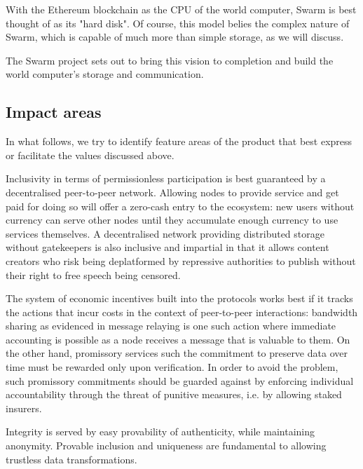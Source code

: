  
With the Ethereum blockchain as the CPU of the world computer, Swarm is best thought of as its "hard disk". Of course, this model belies the complex nature of Swarm, which is capable of much more than simple storage, as we will discuss.

The Swarm project sets out to bring this vision to completion and build the world computer's storage and communication. 

\subsection{Impact areas \statusorange}

In what follows, we try to identify feature areas of the product that best express or facilitate the values discussed above. 

Inclusivity in terms of permissionless participation is best guaranteed by a decentralised peer-to-peer network.  
Allowing nodes to provide service and get paid for doing so will offer a zero-cash entry to the ecosystem: new users without currency can serve other nodes until they accumulate enough currency to use services themselves. A decentralised network providing distributed storage without gatekeepers is also inclusive and impartial in that it allows content creators who risk being deplatformed by repressive  authorities to publish without their right to free speech being censored. 

The system of economic incentives built into the protocols works best if it tracks the actions that incur costs in the context of peer-to-peer interactions: bandwidth sharing as evidenced in message relaying is one such action where immediate accounting is possible as a node receives a message that is valuable to them. On the other hand, promissory services such the commitment to preserve data over time must be rewarded only upon verification. In order to avoid the  problem, such promissory commitments should be guarded against by enforcing individual accountability through the threat of punitive measures, i.e. by allowing staked insurers.

Integrity is served by easy provability of authenticity, while maintaining anonymity.
Provable inclusion and uniqueness are fundamental to allowing trustless data transformations.


